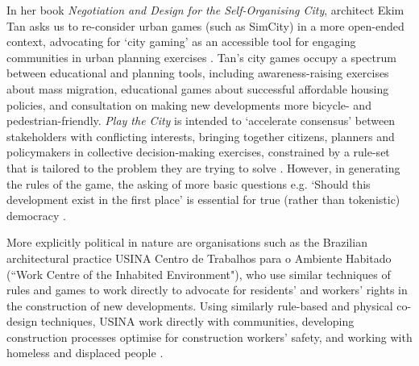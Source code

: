 \documentclass[nofonts,nols,justified,nobib]{tufte-book}
\begin{document}
In her book \emph{Negotiation and Design for the Self-Organising City}, architect Ekim Tan asks us to re-consider urban games (such as SimCity) in a more open-ended context, advocating for `city gaming' as an accessible tool for engaging communities in urban planning exercises \cite{tan_negotiation_2014}. Tan's city games occupy a spectrum between educational and planning tools, including awareness-raising exercises about mass migration, educational games about successful affordable housing policies, and consultation on making new developments more bicycle- and pedestrian-friendly. \emph{Play the City} is intended to `accelerate consensus' between stakeholders with conflicting interests, bringing together citizens, planners and policymakers in collective decision-making exercises, constrained by a rule-set that is tailored to the problem they are trying to solve \cite{tan_city_2017}. However, in generating the rules of the game, the asking of more basic questions e.g. `Should this development exist in the first place' is essential for true (rather than tokenistic) democracy \cite{shaw_informational_2017}.


More explicitly political in nature are organisations such as the Brazilian architectural practice USINA Centro de Trabalhos para o Ambiente Habitado (``Work Centre of the Inhabited Environment"), who use similar techniques of rules and games to work directly to advocate for residents' and workers' rights in the construction of new developments. Using similarly rule-based and physical co-design techniques, USINA work directly with communities, developing construction processes optimise for construction workers' safety, and working with homeless and displaced people \cite{noauthor_usina_ctah_nodate}.
\end{document}
